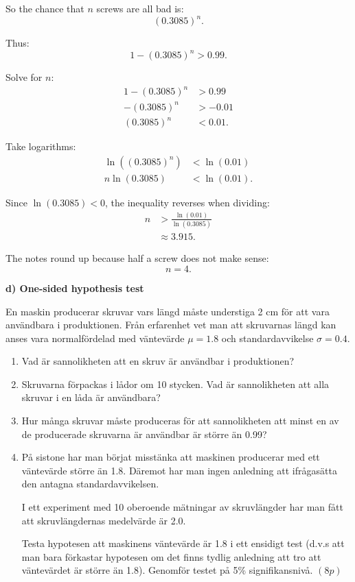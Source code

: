 \documentclass[10pt]{article}
\begin{document}
So the chance that \(n\) screws are all bad is:
\[
(0.3085)^n.
\]

Thus:
\[
1-(0.3085)^n>0.99.
\]

Solve for \(n\):
\begin{align*}
1-(0.3085)^n
&>0.99
\\[2mm]
-(0.3085)^n
&>-0.01
\\[2mm]
(0.3085)^n
&<0.01.
\end{align*}

Take logarithms:
\begin{align*}
\ln\left((0.3085)^n\right)
&<
\ln(0.01)
\\[2mm]
n\ln(0.3085)
&<
\ln(0.01).
\end{align*}

Since \(\ln(0.3085)<0\), the inequality reverses
when dividing:
\begin{align*}
n
&>
\frac{\ln(0.01)}{\ln(0.3085)}
\\[2mm]
&\approx
3.915.
\end{align*}

The notes round up because half a screw does not make
sense:
\[
n=4.
\]

\textbf{d) One-sided hypothesis test}

En maskin producerar skruvar vars längd måste
understiga 2 cm för att vara användbara i
produktionen. Från erfarenhet vet man att skruvarnas
längd kan anses vara normalfördelad med väntevärde
\(\mu=1.8\) och standardavvikelse \(\sigma=0.4\).

\begin{enumerate}[label=\alph*)]
\item Vad är sannolikheten att en skruv är användbar
i produktionen?

\item Skruvarna förpackas i lådor om 10 stycken.
Vad är sannolikheten att alla skruvar i en låda är
användbara?

\item Hur många skruvar måste produceras för att
sannolikheten att minst en av de producerade
skruvarna är användbar är större än 0.99?

\item På sistone har man börjat misstänka att
maskinen producerar med ett väntevärde större än
1.8. Däremot har man ingen anledning att ifrågasätta
den antagna standardavvikelsen.

I ett experiment med 10 oberoende mätningar av
skruvlängder har man fått att skruvlängdernas
medelvärde är 2.0.

Testa hypotesen att maskinens väntevärde är 1.8 i
ett ensidigt test (d.v.s att man bara förkastar
hypotesen om det finns tydlig anledning att tro att
väntevärdet är större än 1.8). Genomför testet på
5\% signifikansnivå. \((8p)\)
\end{enumerate}
\end{document}
